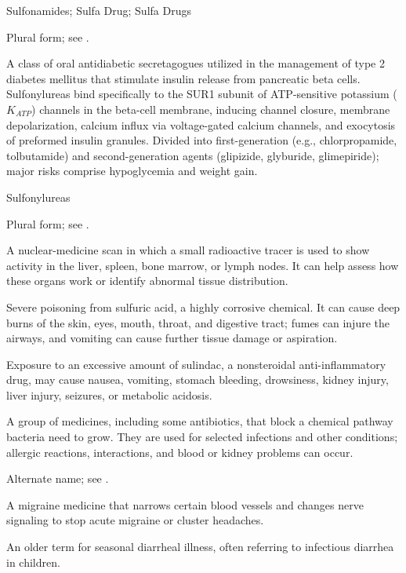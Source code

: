 \synonyms
Sulfonamides; Sulfa Drug; Sulfa Drugs

 Plural form; see .

 A class of oral antidiabetic secretagogues utilized in the management of type 2 diabetes mellitus that stimulate insulin release from pancreatic beta cells. Sulfonylureas bind specifically to the SUR1 subunit of ATP-sensitive potassium ($K_{ATP}$) channels in the beta-cell membrane, inducing channel closure, membrane depolarization, calcium influx via voltage-gated calcium channels, and exocytosis of preformed insulin granules. Divided into first-generation (e.g., chlorpropamide, tolbutamide) and second-generation agents (glipizide, glyburide, glimepiride); major risks comprise hypoglycemia and weight gain.

\synonyms
Sulfonylureas

 Plural form; see .

 A nuclear-medicine scan in which a small radioactive tracer is used to show activity in the liver, spleen, bone marrow, or lymph nodes. It can help assess how these organs work or identify abnormal tissue distribution.

 Severe poisoning from sulfuric acid, a highly corrosive chemical. It can cause deep burns of the skin, eyes, mouth, throat, and digestive tract; fumes can injure the airways, and vomiting can cause further tissue damage or aspiration.

 Exposure to an excessive amount of sulindac, a nonsteroidal anti-inflammatory drug, may cause nausea, vomiting, stomach bleeding, drowsiness, kidney injury, liver injury, seizures, or metabolic acidosis.

 A group of medicines, including some antibiotics, that block a chemical pathway bacteria need to grow. They are used for selected infections and other conditions; allergic reactions, interactions, and blood or kidney problems can occur.

 Alternate name; see .

 A migraine medicine that narrows certain blood vessels and changes nerve signaling to stop acute migraine or cluster headaches.

 An older term for seasonal diarrheal illness, often referring to infectious diarrhea in children.

